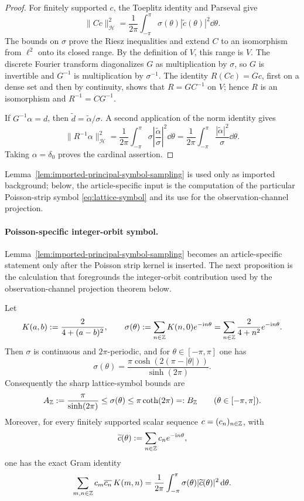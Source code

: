\begin{proof}
For finitely supported \(c\), the Toeplitz identity and Parseval give
\[
 \|Cc\|_{\mathcal H}^2
 =\frac1{2\pi}\int_{-\pi}^{\pi}
   \sigma(\theta)|\widetilde c(\theta)|^2\dd\theta.
\]
The bounds on \(\sigma\) prove the Riesz inequalities and extend \(C\) to
an isomorphism from \(\ell^2\) onto its closed range.  By the definition of
\(V\), this range is \(V\).  The discrete Fourier transform diagonalizes
\(G\) as multiplication by \(\sigma\), so \(G\) is invertible and
\(G^{-1}\) is multiplication by \(\sigma^{-1}\).  The identity
\(R(Cc)=Gc\), first on a dense set and then by continuity, shows that
\(R=GC^{-1}\) on \(V\); hence \(R\) is an isomorphism and
\(R^{-1}=CG^{-1}\).

If \(G^{-1}\alpha=d\), then
\(\widetilde d=\widetilde\alpha/\sigma\).  A second application of the
norm identity gives
\[
 \|R^{-1}\alpha\|_{\mathcal H}^2
 =\frac1{2\pi}\int_{-\pi}^{\pi}
 \sigma\left|\frac{\widetilde\alpha}{\sigma}\right|^2\dd\theta
 =\frac1{2\pi}\int_{-\pi}^{\pi}
 \frac{|\widetilde\alpha|^2}{\sigma}\dd\theta.
\]
Taking \(\alpha=\delta_0\) proves the cardinal assertion.
\end{proof}

Lemma~\ref{lem:imported-principal-symbol-sampling}
is used only as imported background; below, the article-specific input is the
computation of the particular Poisson-strip symbol \eqref{eq:lattice-symbol}
and its use for the observation-channel projection.

\paragraph{Poisson-specific integer-orbit symbol.}
Lemma~\ref{lem:imported-principal-symbol-sampling} becomes an
article-specific statement only after
the Poisson strip kernel is inserted.  The next proposition is the calculation
that foregrounds the integer-orbit contribution used by the observation-channel
projection theorem below.

\begin{proposition}%
\label{prop:poisson-lattice-symbol}
Let
\[
K(a,b):=\frac{2}{4+(a-b)^2},
\qquad
\sigma(\theta):=\sum_{n\in\mathbb{Z}}K(n,0)e^{-\mathrm{i} n\theta}
=\sum_{n\in\mathbb{Z}}\frac{2}{4+n^2}e^{-\mathrm{i} n\theta}.
\]
Then $\sigma$ is continuous and $2\pi$-periodic, and for
$\theta\in[-\pi,\pi]$ one has
\begin{equation}\label{eq:lattice-symbol}
\sigma(\theta)
=\frac{\pi\cosh(2(\pi-|\theta|))}{\sinh(2\pi)}.
\end{equation}
Consequently the sharp lattice-symbol bounds are
\[
A_{\mathbb{Z}}:=\frac{\pi}{\sinh(2\pi)}
\le
\sigma(\theta)
\le
\pi\coth(2\pi)=:B_{\mathbb{Z}}
\qquad(\theta\in[-\pi,\pi]).
\]
Moreover, for every finitely supported scalar sequence
$c=(c_n)_{n\in\mathbb{Z}}$, with
\[
\widetilde c(\theta):=\sum_{n\in\mathbb{Z}}c_ne^{-\mathrm{i} n\theta},
\]
one has the exact Gram identity
\begin{equation}\label{eq:lattice-symbol-form}
\sum_{m,n\in\mathbb{Z}}c_m\overline{c_n}\,K(m,n)
=\frac{1}{2\pi}\int_{-\pi}^{\pi}
\sigma(\theta)|\widetilde c(\theta)|^2\,\mathrm{d}\theta .
\end{equation}
\end{proposition}

